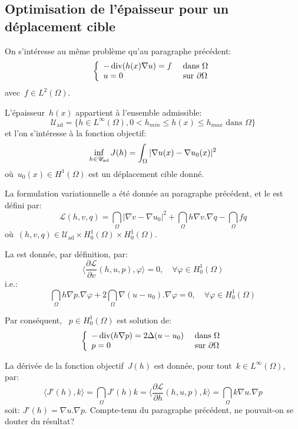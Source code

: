 \medskip
\subsection{Optimisation de l'épaisseur pour un déplacement cible}

On s'intéresse au même problème qu'au paragraphe précédent:
\[\left\{\begin{array}{ll} -\operatorname{div} (h(x)\nabla u)=f &\text{ dans }\Omega\\ u=0 &\text{ sur }\partial\Omega \end{array} \right. \]
avec~$f\in L^2(\Omega)$.

L'épaisseur~$h(x)$ appartient à l'ensemble admissible:
\[ \mathscr{U}_{\text{ad}} = \{ h\in L^\infty(\Omega), 0< h_{min}\le h(x)\le h_{max} \text{ dans }\Omega \} \]
et l'on s'intéresse à la fonction objectif:
\[\colorblue \inf_{h\in\mathscr{U}_{\text{ad}}} J(h) = \dint_\Omega |\nabla u(x)-\nabla u_0(x)|^2 \]
où~$u_0(x)\in H^1(\Omega)$ est un déplacement cible donné.

\medskip
La formulation variationnelle a été donnée au paragraphe précédent, et le  est défini par:
\[ \mathscr{L}(h,v,q) = \dint_\Omega |\nabla v-\nabla u_0|^2 + \dint_\Omega h\nabla v.\nabla q - \dint_\Omega fq \]
où~$(h,v,q)\in \mathscr{U}_{\text{ad}}\times H^1_0(\Omega)\times H^1_0(\Omega)$.

\medskip
La  est donnée, par définition, par: 
\[ \langle \dfrac{\partial \mathscr{L}}{\partial v}(h,u,p),\varphi\rangle=0, \quad \forall\varphi\in H^1_0(\Omega) \]
i.e.:
\[ \dint_\Omega h\nabla p.\nabla\varphi + 2 \dint_\Omega \nabla(u-u_0).\nabla\varphi =0, \quad \forall\varphi\in H^1_0(\Omega) \]

Par conséquent, ~$p\in H^1_0(\Omega)$ est solution de:
\[\left\{\begin{array}{ll}
-\operatorname{div}(h\nabla p) = 2\Delta(u-u_0) &\text{ dans }\Omega\\
p=0 &\text{ sur }\partial\Omega
\end{array}\right.\]

\medskip
La dérivée de la fonction objectif~$J(h)$ est donnée, pour tout~$k\in L^\infty(\Omega)$, par:
\[ \langle J'(h),k\rangle = \dint_\Omega J'(h)k = \langle\dfrac{\partial\mathscr{L}}{\partial h}(h,u,p),k\rangle =\dint_\Omega k\nabla u.\nabla p \]
soit: $J'(h)=\nabla u.\nabla p$. Compte-tenu du paragraphe précédent, ne pouvait-on se douter du résultat?

